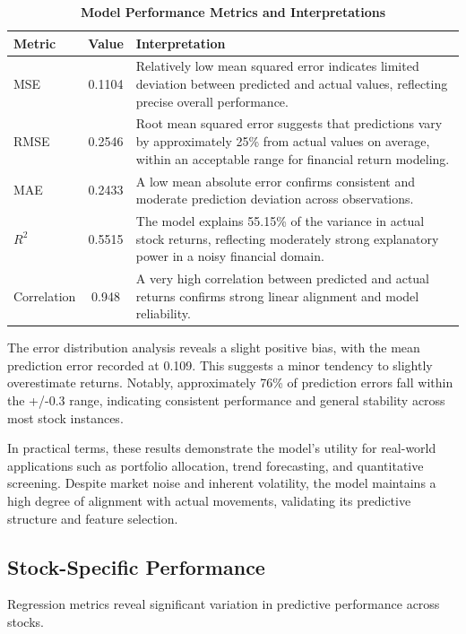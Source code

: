 \documentclass[3p,times,procedia]{elsarticle}
\begin{document}
\begin{table}[!ht]
\centering
\caption{\textbf{Model Performance Metrics and Interpretations}}
\begin{tabular}{|l|c|l|}
\hline
\textbf{Metric} & \textbf{Value} & \textbf{Interpretation} \\
\hline
MSE         & 0.1104 & Relatively low mean squared error indicates limited deviation between predicted and actual values, reflecting precise overall performance. \\
RMSE        & 0.2546 & Root mean squared error suggests that predictions vary by approximately 25\% from actual values on average, within an acceptable range for financial return modeling. \\
MAE         & 0.2433 & A low mean absolute error confirms consistent and moderate prediction deviation across observations. \\
$R^2$       & 0.5515 & The model explains 55.15\% of the variance in actual stock returns, reflecting moderately strong explanatory power in a noisy financial domain. \\
Correlation & 0.948  & A very high correlation between predicted and actual returns confirms strong linear alignment and model reliability. \\
\hline
\end{tabular}
\end{table}

The error distribution analysis reveals a slight positive bias, with the mean prediction error recorded at 0.109. This suggests a minor tendency to slightly overestimate returns. Notably, approximately 76\% of prediction errors fall within the +/-0.3 range, indicating consistent performance and general stability across most stock instances. 

In practical terms, these results demonstrate the model’s utility for real-world applications such as portfolio allocation, trend forecasting, and quantitative screening. Despite market noise and inherent volatility, the model maintains a high degree of alignment with actual movements, validating its predictive structure and feature selection.


\subsection{Stock-Specific Performance}
Regression metrics reveal significant variation in predictive performance across stocks.
\end{document}
